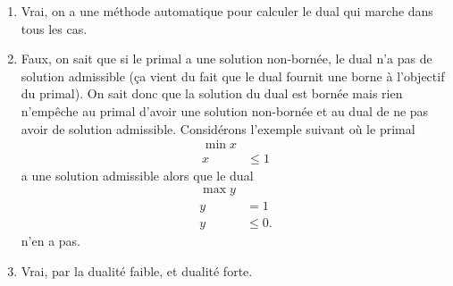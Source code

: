 \begin{enumerate}
\begin{enumerate}






    \end{enumerate}


    \begin{solution}
      \begin{enumerate}
        \item Vrai, on a une méthode automatique pour calculer
          le dual qui marche dans tous les cas.
        \item Faux, on sait que si le primal a une solution non-bornée,
          le dual n'a pas de solution admissible
          (ça vient du fait que le dual fournit une borne à l'objectif
          du primal).
          On sait donc que la solution du dual est bornée mais rien n'empêche
          au primal d'avoir une solution non-bornée et au dual de ne pas
          avoir de solution admissible.
          Considérons l'exemple suivant où le primal
          \begin{align*}
            \min x\\
            x & \leq 1
          \end{align*}
          a une solution admissible alors que le dual
          \begin{align*}
            \max y\\
            y & = 1\\
            y & \leq 0.
          \end{align*}
          n'en a pas.
        \item Vrai, par la dualité faible, et dualité forte.
      \end{enumerate}
    \end{solution}


\end{enumerate}
